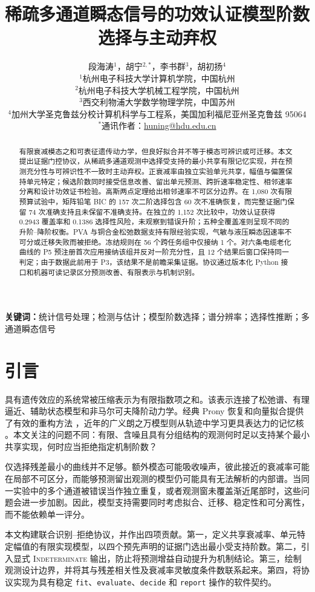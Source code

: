 \documentclass[UTF8,11pt]{ctexart}
\title{稀疏多通道瞬态信号的功效认证模型阶数选择与主动弃权}
\author{段海涛$^{1}$，胡宁$^{2,*}$，李书群$^{3}$，胡初扬$^{4}$\\[2mm]
\small $^1$杭州电子科技大学计算机学院，中国杭州\\
\small $^2$杭州电子科技大学机械工程学院，中国杭州\\
\small $^3$西交利物浦大学数学物理学院，中国苏州\\
\small $^4$加州大学圣克鲁兹分校计算机科学与工程系，美国加利福尼亚州圣克鲁兹 95064\\[1mm]
\small $^*$通讯作者：\href{mailto:huning@hdu.edu.cn}{huning@hdu.edu.cn}}
\date{}
\newcommand{\doublespacing}{\renewcommand{\baselinestretch}{2}\selectfont}
\newcommand{\indet}{\textsc{Indeterminate}}
\begin{document}
\doublespacing
\maketitle

\begin{abstract}
有限衰减模态之和可表征遗传动力学，但良好拟合并不等于模态可辨识或可迁移。本文提出证据门控协议，从稀疏多通道观测中选择受支持的最小共享有限记忆实现，并在预测充分性与可辨识性不一致时主动弃权。正衰减率由独立实验单元共享，幅值与偏置保持单元特定；候选阶数同时接受信息改善、留出单元预测、跨折速率稳定性、相邻速率分离和设计功效证书检验。高斯两点定理给出相邻速率不可区分边界。在 1,080 次有限预算试验中，矩阵铅笔 BIC 的 157 次二阶选择包含 60 次不准确恢复，而完整证据门保留 74 次准确支持且未保留不准确支持。在独立的 1,152 次比较中，功效认证获得 0.2943 覆盖率和 0.1386 选择性风险，未观察到错误升阶；五种全覆盖准则呈现不同的升阶--降阶权衡。PVA 与铜合金松弛数据支持有限经验实现，气敏与液压瞬态因速率不可分或迁移失败而被拒绝。冻结规则在 56 个跨任务组中仅接纳 1 个。对六条电缆老化曲线的 P5 预注册首次应用接纳该组并反对一阶充分性，且 12 个结果后窗口保持同一判定；由于数据此前用于 P3，该结果不是前瞻采集证据。协议通过版本化 Python 接口和机器可读记录区分预测改善、有限表示与机制识别。
\end{abstract}

\noindent\textbf{关键词：}统计信号处理；检测与估计；模型阶数选择；谱分辨率；选择性推断；多通道瞬态信号

\section{引言}
具有遗传效应的系统常被压缩表示为有限指数项之和。该表示连接了松弛谱、有理逼近、辅助状态模型和非马尔可夫降阶动力学。经典 Prony 恢复和向量拟合提供了有效的重构方法 \cite{stampfer2020gop,gustavsen1999vector,bosner2021parallel}，近年的广义朗之万模型则从轨迹中学习更具表达力的记忆核 \cite{lei2016parameterization,ge2024state,lang2026learning}。本文关注的问题不同：有限、含噪且具有分组结构的观测何时足以支持某个最小共享实现，何时应当拒绝指定机制阶数？

仅选择残差最小的曲线并不足够。额外模态可能吸收噪声，彼此接近的衰减率可能在局部不可区分，而能够预测留出观测的模型仍可能具有无法解析的内部谱。当同一实验中的多个通道被错误当作独立重复，或者观测窗未覆盖渐近尾部时，这些问题会进一步加剧。因此，模型支持需要同时考虑拟合、迁移、稳定性和可分离性，而不能依赖单一评分。

本文构建联合识别--拒绝协议，并作出四项贡献。第一，定义共享衰减率、单元特定幅值的有限实现模型，以四个预先声明的证据门选出最小受支持阶数。第二，引入显式 \indet{} 输出，防止将预测增益自动提升为机制结论。第三，绘制观测设计边界，并将其与残差相关性及衰减率灵敏度条件数联系起来。第四，将协议实现为具有稳定 \texttt{fit}、\texttt{evaluate}、\texttt{decide} 和 \texttt{report} 操作的软件契约。
\end{document}
